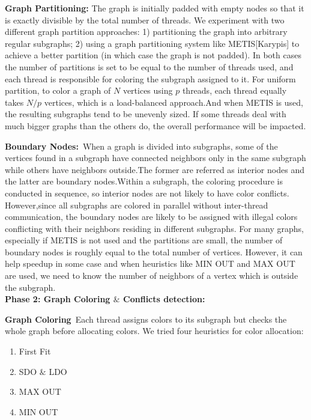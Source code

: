 \documentclass[preprint]{sigplanconf}
\begin{document}
\textbf{Graph Partitioning:}
The graph is initially padded with empty nodes so that it is exactly divisible by the total number of threads. We experiment with two different graph partition approaches: 1) partitioning the graph into arbitrary regular subgraphs; 2) using a graph partitioning system like METIS[Karypis] to achieve a better partition (in which case the graph is not padded). In both cases the number of partitions is set to be equal to the number of threads used, and each thread is responsible for coloring the subgraph assigned to it. 
For uniform partition, to color a graph of $N$ vertices using $p$ threads, each thread equally takes $N/p$ vertices, which is a load-balanced approach.And when METIS is used, the resulting subgraphs tend to be unevenly sized. If some threads deal with much bigger graphs than the others do, the overall performance will be impacted.


\textbf{Boundary Nodes:}\
When a graph is divided into subgraphs, some of the vertices found in a subgraph have connected neighbors only in the same subgraph while others have neighbors outside.The former are referred as interior nodes and the latter are boundary nodes.Within a subgraph, the coloring procedure is conducted in sequence, so interior nodes are not likely to have color conflicts. However,since all subgraphs are colored in parallel without inter-thread communication, the boundary nodes are likely to be assigned with illegal colors conflicting with their neighbors residing in different subgraphs.  
 For many graphs, especially if METIS is not used and the partitions are small, the number of boundary nodes is roughly equal to the total number of vertices. However, it can help speedup in some case and when heuristics like MIN OUT and MAX OUT are used, we need to know the number of neighbors of a vertex which is outside the subgraph.\\

\textbf{Phase 2: Graph Coloring $\&$ Conflicts detection:}\

\textbf{Graph Coloring}\
Each thread assigns colors to its subgraph but checks the whole graph before allocating colors. We tried four heuristics for color allocation:
\renewcommand{\labelenumi}{\roman{enumi}) } 
\begin{enumerate}
  \item First Fit
  \item SDO $\&$ LDO
  \item MAX OUT
  \item MIN OUT
\end{enumerate}
\end{document}
